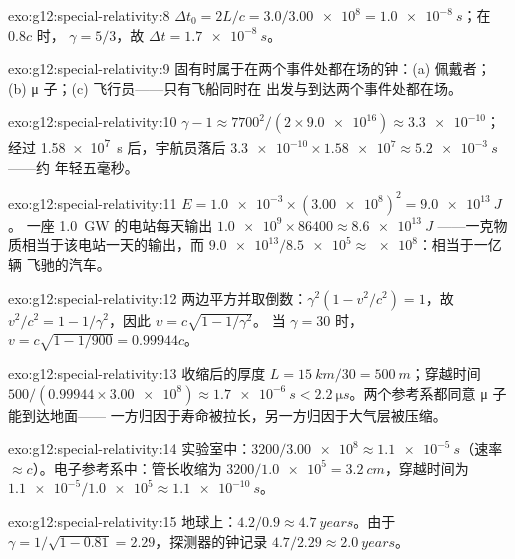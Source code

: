 \begin{solution}{exo:g12:special-relativity:8}
$\Delta t_0 = 2L/c = 3.0/\num{3.00e8} = \qty{1.0e-8}{s}$；在 $0.8c$ 时，
$\gamma = 5/3$，故 $\Delta t = \qty{1.7e-8}{s}$。
\end{solution}

\begin{solution}{exo:g12:special-relativity:9}
固有时属于在两个事件处都在场的钟：(a) 佩戴者；
(b) μ 子；(c) 飞行员——只有飞船同时在
出发与到达两个事件处都在场。
\end{solution}

\begin{solution}{exo:g12:special-relativity:10}
$\gamma - 1 \approx 7700^2/(2 \times \num{9.0e16}) \approx
\num{3.3e-10}$；经过 \qty{1.58e7}{s} 后，宇航员落后
$\num{3.3e-10} \times \num{1.58e7} \approx \qty{5.2e-3}{s}$ ——约
年轻五毫秒。
\end{solution}

\begin{solution}{exo:g12:special-relativity:11}
$E = \num{1.0e-3} \times (\num{3.00e8})^2 = \qty{9.0e13}{J}$。
一座 \qty{1.0}{GW} 的电站每天输出 $\num{1.0e9} \times 86400 \approx
\qty{8.6e13}{J}$ ——一克物质相当于该电站一天的输出，而
$\num{9.0e13}/\num{8.5e5} \approx \num{e8}$：相当于一亿辆
飞驰的汽车。
\end{solution}

\begin{solution}{exo:g12:special-relativity:12}
两边平方并取倒数：$\gamma^2(1 - v^2/c^2) = 1$，故
$v^2/c^2 = 1 - 1/\gamma^2$，因此 $v = c\sqrt{1 - 1/\gamma^2}$。
当 $\gamma = 30$ 时，$v = c\sqrt{1 - 1/900} = 0.99944c$。
\end{solution}

\begin{solution}{exo:g12:special-relativity:13}
收缩后的厚度 $L = \qty{15}{km}/30 = \qty{500}{m}$；穿越时间
$500/(0.99944 \times \num{3.00e8}) \approx \qty{1.7e-6}{s} <
\qty{2.2}{\micro s}$。两个参考系都同意 μ 子能到达地面——
一方归因于寿命被拉长，另一方归因于大气层被压缩。
\end{solution}

\begin{solution}{exo:g12:special-relativity:14}
实验室中：$3200/\num{3.00e8} \approx \qty{1.1e-5}{s}$（速率
$\approx c$）。电子参考系中：管长收缩为
$3200/\num{1.0e5} = \qty{3.2}{cm}$，穿越时间为
$\num{1.1e-5}/\num{1.0e5} \approx \qty{1.1e-10}{s}$。
\end{solution}

\begin{solution}{exo:g12:special-relativity:15}
地球上：$4.2/0.9 \approx \qty{4.7}{years}$。由于
$\gamma = 1/\sqrt{1 - 0.81} = 2.29$，探测器的钟记录
$4.7/2.29 \approx \qty{2.0}{years}$。
\end{solution}


